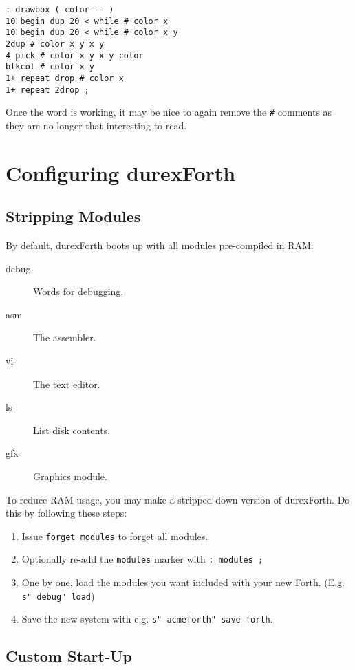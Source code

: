 \begin{verbatim}
: drawbox ( color -- )
10 begin dup 20 < while # color x
10 begin dup 20 < while # color x y
2dup # color x y x y
4 pick # color x y x y color
blkcol # color x y
1+ repeat drop # color x
1+ repeat 2drop ;
\end{verbatim}

Once the word is working, it may be nice to again remove the \texttt{\#} comments as
they are no longer that interesting to read.

\section{Configuring durexForth}

\subsection{Stripping Modules}

By default, durexForth boots up with all modules pre-compiled in RAM:

\begin{description}
\item[debug] Words for debugging.
\item[asm] The assembler.
\item[vi] The text editor.
\item[ls] List disk contents.
\item[gfx] Graphics module.
\end{description}

To reduce RAM usage, you may make a stripped-down version of durexForth. Do this by following these steps:

\begin{enumerate}
\item Issue \texttt{forget modules} to forget all modules.
\item Optionally re-add the \texttt{modules} marker with \texttt{: modules ;}
\item One by one, load the modules you want included with your new Forth. (E.g. \texttt{s" debug" load})
\item Save the new system with e.g. \texttt{s" acmeforth" save-forth}.
\end{enumerate}

\subsection{Custom Start-Up}

